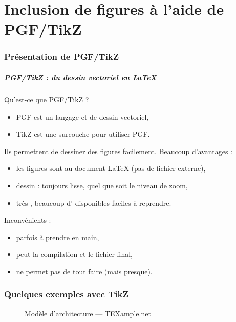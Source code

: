 
\part{Inclusion de figures à l'aide de PGF/TikZ}

\section{Présentation de PGF/TikZ}

\begin{frame}
  \frametitle{PGF/TikZ : du dessin vectoriel en \LaTeX}

Qu'est-ce que PGF/TikZ ?
\begin{itemize}
  \item PGF est un langage  et  de dessin vectoriel,
  \item TikZ est une surcouche  pour utiliser PGF.
\end{itemize}

\bigskip
Ils permettent de dessiner des figures facilement. Beaucoup d'avantages :
\begin{itemize}
  \item les figures sont  au document \LaTeX{} (pas de fichier externe),
  \item dessin  : toujours lisse, quel que soit le niveau de zoom,
  \item très , beaucoup d' disponibles faciles à reprendre.
\end{itemize}

\bigskip
Inconvénients :
\begin{itemize}
  \item parfois  à prendre en main,
  \item peut  la compilation et le fichier final,
  \item ne permet pas de tout faire (mais presque).
\end{itemize}
\end{frame}



\section{Quelques exemples avec TikZ}



\begin{frame}
  \begin{figure}
    \centering
    \tikzexa
    \caption{\footnotesize Modèle d'architecture --- TEXample.net \cite{tikzandpgfexamples}}
  \end{figure}
\end{frame}

